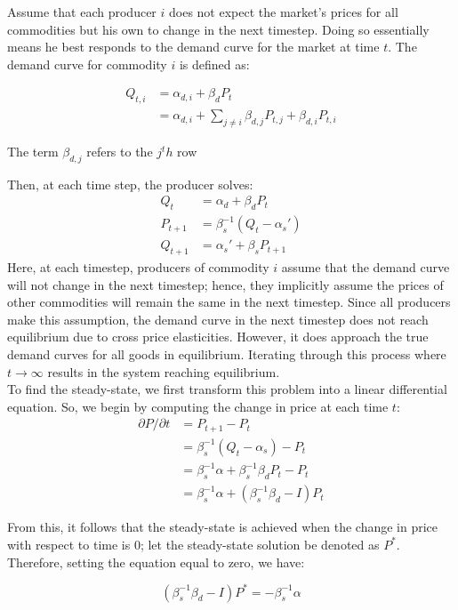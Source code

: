 \documentclass[12pt]{article}
\begin{document}
Assume that each producer $i$ does not expect the market's prices for all commodities but his own to change in the next timestep. Doing so essentially means he best responds to the demand curve for the market at time $t$. The demand curve for commodity $i$ is defined as:

\begin{align*}
Q_{t,i} &= \alpha_{d,i} + \beta_d P_t \\
&= \alpha_{d,i} + \sum_{j \neq i} \beta_{d,j} P_{t,j} + \beta_{d,i} P_{t,i}
\end{align*}

The term $\beta_{d,j}$ refers to the $j^th$ row 

 Then, at each time step, the producer solves:
\begin{align*}
Q_{t} &= \alpha_d + \beta_d P_t \\
P_{t+1}& = \beta_s^{-1} (Q_{t} - \alpha_s') \\
Q_{t+1} &= \alpha_s' + \beta_s P_{t+1}
\end{align*}
Here, at each timestep, producers of commodity $i$ assume that the demand curve will not change in the next timestep; hence, they implicitly assume the prices of other commodities will remain the same in the next timestep. Since all producers make this assumption, the demand curve in the next timestep does not reach equilibrium due to cross price elasticities. However, it does approach the true demand curves for all goods in equilibrium. Iterating through this process where $t \to \infty$ results in the system reaching equilibrium.   \\

To find the steady-state, we first transform this problem into a linear differential equation. So, we begin by computing the change in price at each time $t$:
\begin{align*}
{\partial P}/{\partial t} &= P_{t+1} - P_t 		     \\
&= \beta_s^{-1} (Q_{t} - \alpha_s) - P_t				 \\
&= \beta_s^{-1} \alpha  + \beta_s^{-1} \beta_d P_t - P_t \\
&= \beta_s^{-1} \alpha  + (\beta_s^{-1} \beta_d - I) P_t
\end{align*}

From this, it follows that the steady-state is achieved when the change in price with respect to time is 0; let the steady-state solution be denoted as $P^*$. Therefore, setting the equation equal to zero, we have:

$$(\beta_s^{-1} \beta_d - I) P^* = -\beta_s^{-1} \alpha$$
\end{document}
